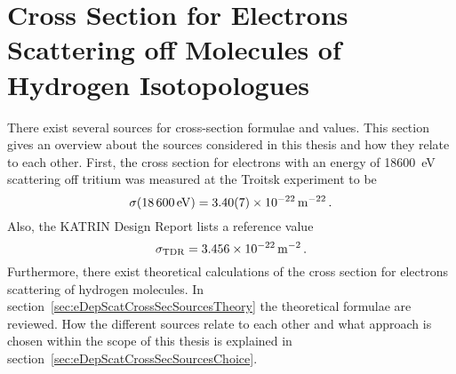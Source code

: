 \section{Cross Section for Electrons Scattering off Molecules of Hydrogen Isotopologues}
\label{sec:eDepScatCrossSecSources}
There exist several sources for cross-section formulae and values. This section gives an overview about the sources considered in this thesis and how they relate to each other. First, the cross section for electrons with an energy of \SI{18600}{eV} scattering off tritium was measured at the Troitsk experiment to be~\cite{Aseev2000}
\begin{equation}
	\sigma(\SI{18600}{eV}) = \SI{3.40\pm0.07e-22}{m^{-22}} \fullstop
\end{equation}
Also, the KATRIN Design Report lists a reference value~\cite{Angrik:2005ep}
\begin{equation}
	\sigma_\mathrm{TDR} = \SI{3.456e-22}{m^{-2}} \fullstop
\end{equation}
Furthermore, there exist theoretical calculations of the cross section for electrons scattering of hydrogen molecules. In section~\ref{sec:eDepScatCrossSecSourcesTheory} the theoretical formulae are reviewed. How the different sources relate to each other and what approach is chosen within the scope of this thesis is explained in section~\ref{sec:eDepScatCrossSecSourcesChoice}.
